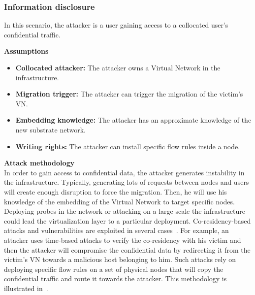 \subsubsection{Information disclosure}
In this scenario, the attacker is a  user  gaining access to a collocated user's confidential traffic.

\textbf{Assumptions}
\begin{itemize}
    \item \textbf{Collocated attacker:} The attacker owns a Virtual Network in the infrastructure.
    \item \textbf{Migration trigger:} The attacker can trigger the migration of the victim's VN.
    \item \textbf{Embedding knowledge:} The attacker has an approximate knowledge of the new substrate network.
    \item \textbf{Writing rights:} The attacker can install specific flow rules inside a node.
\end{itemize}


\textbf{Attack methodology}\textbf{\\}
In order to gain access to confidential data, the attacker generates instability in the infrastructure. Typically, generating lots of requests between nodes and users will create enough disruption to force the migration.
Then, he will use his knowledge of the embedding of the Virtual Network to target specific nodes.
Deploying probes in the network or attacking on a large scale the infrastructure could lead the virtualization layer to a particular deployment. Co-residency-based attacks and vulnerabilities are exploited in several cases~\cite{malicious-atya2017,nomad-Moon2015b,getoffmucloud-Ristenpart2009,stalling-atya2017}.
For example, an attacker uses time-based attacks to verify the co-residency with his victim and then the attacker will compromise the confidential data by redirecting it from the victim's VN towards a malicious host belonging to him.
Such attacks rely on deploying specific flow rules on a set of physical nodes that will copy the confidential traffic and route it towards the attacker.
This methodology is illustrated in~\cite{Costa2015,Sphinx-Dhawan2015}.


